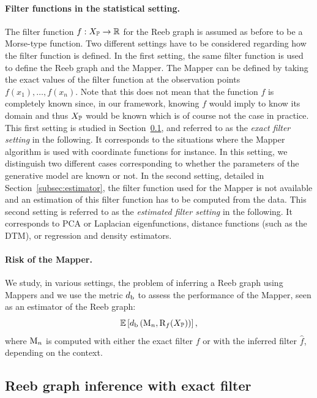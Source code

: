 \paragraph{Filter functions in the statistical setting.} The filter function  $f:X_{\mathbb{P}} \rightarrow \mathbb{R}$ 
for the Reeb graph is assumed as before to be a Morse-type function. Two different settings have to be 
considered regarding how the filter function is defined. In the first setting, the same filter function is used 
to define the Reeb graph  and the Mapper. The Mapper can be defined by taking the exact values of the filter function 
at the observation points $ f(x_1),\dots,f(x_n)$. Note that this does not mean that the function $f$ is completely known 
since, in our framework, knowing $f$ would imply to know its domain and thus $X_{\mathbb{P}}$ would be known which is of course 
not the case in practice. This first setting is studied in Section~\ref{subsec:exact}, and 
referred to as the {\it exact filter setting} in the following. It corresponds 
to the situations where the Mapper algorithm is used with coordinate functions for instance. 
In this setting, we distinguish two different cases corresponding to whether the parameters of the generative 
model are known or not.
In the second setting, detailed in Section~\ref{subsec:estimator}, the filter function used for 
the Mapper is not available and an estimation of this filter function has to be computed from the data. 
This second setting is referred to as the {\it estimated filter setting} in the following. It corresponds to  
PCA or Laplacian eigenfunctions, distance functions (such as the DTM), or regression and density estimators. 


\paragraph{Risk of the Mapper.} We study, in various settings, the problem of inferring a Reeb graph using Mappers and we use 
the metric $d_{\rm b}$ to assess the performance of the Mapper, seen as an estimator of the Reeb graph:
$$\mathbb{E} \left[ d_{\rm b}\left(\mathrm{M}_{n},\mathrm{R}_f(X_{\mathbb{P}})  \right)\right],$$
where $\mathrm{M}_n$ is computed with either the exact filter $f$ or with the inferred filter $\hat f$, depending on the context.


\subsection{Reeb graph inference with exact filter}
\label{subsec:exact}


